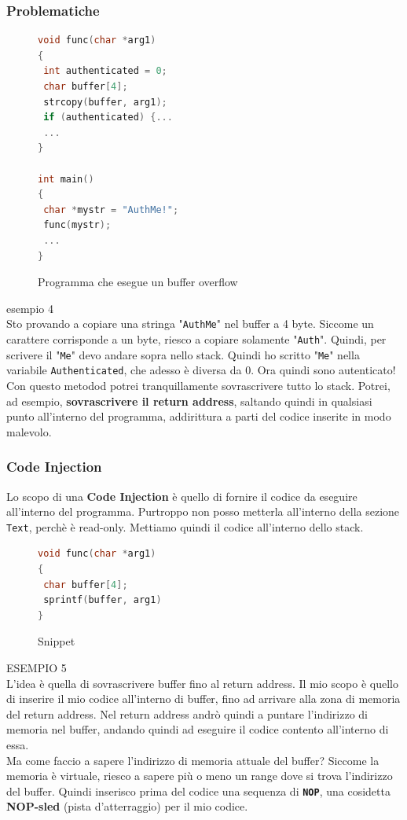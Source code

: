 \documentclass[a4paper,12pt]{article}
\begin{document}
\subsubsection{Problematiche}

\begin{figure}[H]
\begin{lstlisting}[language=C++]
void func(char *arg1)
{
 int authenticated = 0;
 char buffer[4];
 strcopy(buffer, arg1);
 if (authenticated) {...
 ...
}

int main()
{
 char *mystr = "AuthMe!";
 func(mystr);
 ...
}
\end{lstlisting}
\caption{Programma che esegue un buffer overflow}
\end{figure}
esempio 4\\
Sto provando a copiare una stringa "\texttt{AuthMe}" nel buffer a 4 byte. Siccome un carattere corrisponde a un byte, riesco a copiare solamente "\texttt{Auth}". Quindi, per scrivere il "\texttt{Me}" devo andare sopra nello stack. Quindi ho scritto "\texttt{Me}" nella variabile \texttt{Authenticated}, che adesso è diversa da 0. Ora quindi sono autenticato!\\
Con questo metodod potrei tranquillamente sovrascrivere tutto lo stack. Potrei, ad esempio, \textbf{sovrascrivere il return address}, saltando quindi in qualsiasi punto all'interno del programma, addirittura a parti del codice inserite in modo malevolo.

\subsubsection{Code Injection}
Lo scopo di una \textbf{Code Injection} è quello di fornire il codice da eseguire all'interno del programma. Purtroppo non posso metterla all'interno della sezione \texttt{Text}, perchè è read-only. Mettiamo quindi il codice all'interno dello stack.

\begin{figure}[H]
\begin{lstlisting}[language=C++]
void func(char *arg1)
{
 char buffer[4];
 sprintf(buffer, arg1)
}
\end{lstlisting}
\caption{Snippet}
\end{figure}
ESEMPIO 5\\
L'idea è quella di sovrascrivere buffer fino al return address. Il mio scopo è quello di inserire il mio codice all'interno di buffer, fino ad arrivare alla zona di memoria del return address. Nel return address andrò quindi a puntare l'indirizzo di memoria nel buffer, andando quindi ad eseguire il codice contento all'interno di essa.\\
Ma come faccio a sapere l'indirizzo di memoria attuale del buffer? Siccome la memoria è virtuale, riesco a sapere più o meno un range dove si trova l'indirizzo del buffer. Quindi inserisco prima del codice una sequenza di \textbf{\texttt{NOP}}, una cosidetta \textbf{NOP-sled} (pista d'atterraggio) per il mio codice.
\end{document}
